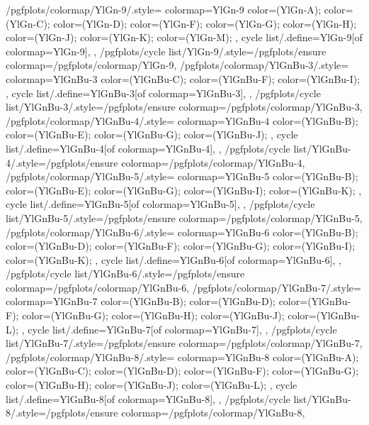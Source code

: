 {  %
  /pgfplots/colormap/YlGn-9/.style={
    colormap={YlGn-9}{
      color=(YlGn-A);
      color=(YlGn-C);
      color=(YlGn-D);
      color=(YlGn-F);
      color=(YlGn-G);
      color=(YlGn-H);
      color=(YlGn-J);
      color=(YlGn-K);
      color=(YlGn-M);
    },
    cycle list/.define={YlGn-9}{[of colormap=YlGn-9]},
  },
  /pgfplots/cycle list/YlGn-9/.style={/pgfplots/ensure colormap={/pgfplots/colormap/YlGn-9}},
  /pgfplots/colormap/YlGnBu-3/.style={
    colormap={YlGnBu-3}{
      color=(YlGnBu-C);
      color=(YlGnBu-F);
      color=(YlGnBu-I);
    },
    cycle list/.define={YlGnBu-3}{[of colormap=YlGnBu-3]},
  },
  /pgfplots/cycle list/YlGnBu-3/.style={/pgfplots/ensure colormap={/pgfplots/colormap/YlGnBu-3}},
  /pgfplots/colormap/YlGnBu-4/.style={
    colormap={YlGnBu-4}{
      color=(YlGnBu-B);
      color=(YlGnBu-E);
      color=(YlGnBu-G);
      color=(YlGnBu-J);
    },
    cycle list/.define={YlGnBu-4}{[of colormap=YlGnBu-4]},
  },
  /pgfplots/cycle list/YlGnBu-4/.style={/pgfplots/ensure colormap={/pgfplots/colormap/YlGnBu-4}},
  /pgfplots/colormap/YlGnBu-5/.style={
    colormap={YlGnBu-5}{
      color=(YlGnBu-B);
      color=(YlGnBu-E);
      color=(YlGnBu-G);
      color=(YlGnBu-I);
      color=(YlGnBu-K);
    },
    cycle list/.define={YlGnBu-5}{[of colormap=YlGnBu-5]},
  },
  /pgfplots/cycle list/YlGnBu-5/.style={/pgfplots/ensure colormap={/pgfplots/colormap/YlGnBu-5}},
  /pgfplots/colormap/YlGnBu-6/.style={
    colormap={YlGnBu-6}{
      color=(YlGnBu-B);
      color=(YlGnBu-D);
      color=(YlGnBu-F);
      color=(YlGnBu-G);
      color=(YlGnBu-I);
      color=(YlGnBu-K);
    },
    cycle list/.define={YlGnBu-6}{[of colormap=YlGnBu-6]},
  },
  /pgfplots/cycle list/YlGnBu-6/.style={/pgfplots/ensure colormap={/pgfplots/colormap/YlGnBu-6}},
  /pgfplots/colormap/YlGnBu-7/.style={
    colormap={YlGnBu-7}{
      color=(YlGnBu-B);
      color=(YlGnBu-D);
      color=(YlGnBu-F);
      color=(YlGnBu-G);
      color=(YlGnBu-H);
      color=(YlGnBu-J);
      color=(YlGnBu-L);
    },
    cycle list/.define={YlGnBu-7}{[of colormap=YlGnBu-7]},
  },
  /pgfplots/cycle list/YlGnBu-7/.style={/pgfplots/ensure colormap={/pgfplots/colormap/YlGnBu-7}},
  /pgfplots/colormap/YlGnBu-8/.style={
    colormap={YlGnBu-8}{
      color=(YlGnBu-A);
      color=(YlGnBu-C);
      color=(YlGnBu-D);
      color=(YlGnBu-F);
      color=(YlGnBu-G);
      color=(YlGnBu-H);
      color=(YlGnBu-J);
      color=(YlGnBu-L);
    },
    cycle list/.define={YlGnBu-8}{[of colormap=YlGnBu-8]},
  },
  /pgfplots/cycle list/YlGnBu-8/.style={/pgfplots/ensure colormap={/pgfplots/colormap/YlGnBu-8}},
}
